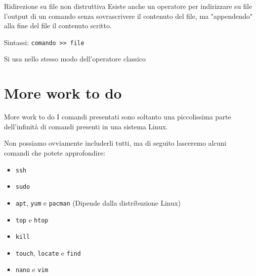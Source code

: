 \documentclass{beamer}
\begin{document}
\begin{frame}{Ridirezione su file non distruttiva}
  Esiste anche un operatore per indirizzare su file l'output di un comando senza 
  sovrascrivere il contenuto del file, ma "appendendo" alla fine del file il
  contenuto scritto.\bigskip

  Sintassi: \texttt{comando >> file}\bigskip

  Si usa nello stesso modo dell'operatore classico\bigskip
\end{frame}


\section{More work to do}
\begin{frame}{More work to do}
  I comandi presentati sono soltanto una piccolissima parte dell'infinità di 
  comandi presenti in una sistema Linux.\bigskip 

  Non possiamo ovviamente includerli tutti, ma di seguito lasceremo alcuni 
  comandi che potete approfondire:
  \begin{itemize}
    \item \texttt{ssh}
    \item \texttt{sudo}
    \item \texttt{apt}, \texttt{yum} e \texttt{pacman} (Dipende dalla 
      distribuzione Linux)
    \item \texttt{top} e \texttt{htop}
    \item \texttt{kill}
    \item \texttt{touch}, \texttt{locate} e  \texttt{find} 
    \item \texttt{nano} e \texttt{vim}
  \end{itemize}
\end{frame}
    
\end{document}
